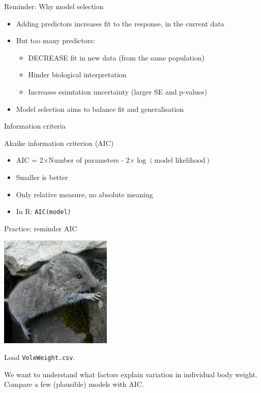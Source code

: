 \documentclass[12pt]{beamer}\usepackage[]{graphicx}\usepackage[]{color}
\begin{document}
\begin{frame}{Reminder: Why model selection}

  \begin{exampleblock}{}
    \begin{itemize}
      \item Adding predictors increases fit to the response, in the current data
      \item But too many predictors:
        \begin{itemize}
          \item DECREASE fit in new data (from the same population)
          \item Hinder biological interpretation
          \item Increases esimtation uncertainty (larger SE and p-values)
        \end{itemize}
      \item Model selection aims to balance fit and generalisation 
    \end{itemize}
  \end{exampleblock}
\end{frame}

\begin{frame}{Information criteria}

\begin{exampleblock}{Akaike information criterion (AIC)}
  \begin{itemize}[<+->]
    \item AIC = 2$\times$Number of parameters - 2$\times \log(\text{model likelihood})$
    \item Smaller is better
    \item Only relative measure, no absolute meaning
    \item In R: \texttt{AIC(model)}
  \end{itemize}
\end{exampleblock}

\end{frame}

\begin{frame}{Practice: reminder AIC}

\begin{center}
  \includegraphics[width=0.4\textwidth]{Figures/vole}
\end{center}

Load \texttt{VoleWeight.csv}. 

We want to understand what factors explain variation in individual body weight. Compare a few (plausible) models with AIC.

\end{frame}
\end{document}
